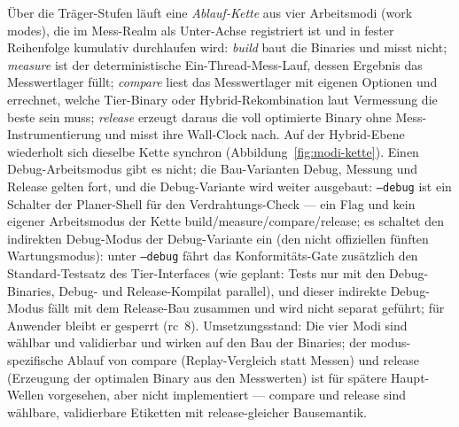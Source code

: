 \begin{nurlang}
Über die Träger-Stufen läuft eine \emph{Ablauf-Kette} aus vier Arbeitsmodi (work modes), die im
Mess-Realm als Unter-Achse registriert ist und in fester Reihenfolge kumulativ durchlaufen wird:
\emph{build} baut die Binaries und misst nicht; \emph{measure} ist der deterministische
Ein-Thread-Mess-Lauf, dessen Ergebnis das Messwertlager füllt; \emph{compare} liest das Messwertlager
mit eigenen Optionen und errechnet, welche Tier-Binary oder Hybrid-Rekombination laut Vermessung die
beste sein muss; \emph{release} erzeugt daraus die voll optimierte Binary ohne Mess-Instrumentierung
und misst ihre Wall-Clock nach. Auf der Hybrid-Ebene wiederholt sich dieselbe Kette synchron
(Abbildung~\ref{fig:modi-kette}). Einen Debug-Arbeitsmodus gibt es nicht; die Bau-Varianten Debug, Messung und Release gelten fort, und die Debug-Variante wird weiter ausgebaut: \texttt{--debug} ist ein Schalter der Planer-Shell für den Verdrahtungs-Check --- ein Flag und kein eigener
Arbeitsmodus der Kette build/measure/compare/release; es schaltet den indirekten Debug-Modus der Debug-Variante ein
(den nicht offiziellen fünften Wartungsmodus): unter \texttt{--debug} fährt das Konformitäts-Gate zusätzlich den
Standard-Testsatz des Tier-Interfaces (wie geplant: Tests nur mit den Debug-Binaries,
Debug- und Release-Kompilat parallel), und dieser indirekte Debug-Modus fällt mit dem Release-Bau
zusammen und wird nicht separat geführt; für Anwender bleibt er gesperrt (rc~8). Umsetzungsstand: Die
vier Modi sind wählbar und validierbar und wirken auf den Bau der Binaries; der modus-spezifische Ablauf
von compare (Replay-Vergleich statt Messen) und release (Erzeugung der optimalen Binary aus den
Messwerten) ist für spätere Haupt-Wellen vorgesehen, aber nicht implementiert --- compare und release sind
wählbare, validierbare Etiketten mit release-gleicher Bausemantik.
\begin{figure}[htbp]\centering
{}
\end{figure}
\end{nurlang}

